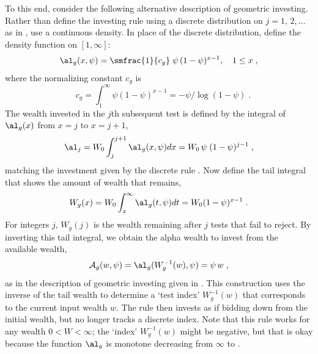 \documentclass[12pt]{article}
\begin{document}
 To this end, consider the following alternative description of geometric
 investing.  Rather than define the investing rule using a discrete distribution
 on $j=1,\,2,\ldots$ as in , use a continuous density.  In place of
 the discrete distribution, define the density function on $[1,\infty]$:
 \begin{equation}
   \al_{g}(x,\psi) = \smfrac{1}{c_g} \; \psi\,(1-\psi)^{x-1}, \quad 1 \le x\;,
 \label{eq:alg}
 \end{equation}
 where the normalizing constant $c_g$ is
 \begin{displaymath}
   \quad c_g = \int_1^\infty \psi(1-\psi)^{x-1} = -\psi/\log (1-\psi)\;.     
 \end{displaymath}
 The wealth invested in the $j$th subsequent test is defined by the integral of
 $\al_g(x)$ from $x=j$ to $x=j+1$,
 \begin{equation}
    \al_j = W_0 \int_j^{j+1} \al_g(x,\psi) dx = W_0 \, \psi\; (1-\psi)^{j-1} \;,
 \label{eq:alj2}
 \end{equation}
 matching the investment given by the discrete rule .  Now define
 the tail integral that shows the amount of wealth that remains,
 \begin{equation}
    W_g(x) = W_0 \int_x^\infty \al_g(t,\psi) dt = W_0 (1-\psi)^{x-1}\;.
 \label{eq:Wg}
 \end{equation}
 For integers $j$, $W_g(j)$ is the wealth remaining after $j$ tests that fail to
 reject.  By inverting this tail integral, we obtain the alpha wealth to invest
 from the available wealth,
 \begin{equation}
   {\cal A}_g(w,\psi) = \al_g(W_g^{-1}(w),\psi) = \psi\,w \;,
 \label{eq:Ag}
 \end{equation}
 as in the description of geometric investing given in .  This
 construction uses the inverse of the tail wealth to determine a `test index'
 $W_g^{-1}(w)$ that corresponds to the current input wealth $w$.  The rule then
 invests as if bidding down from the initial wealth, but no longer tracks a
 discrete index.  Note that this rule works for any wealth $0 < W < \infty$; the
`index' $W_g^{-1}(w)$ might be negative, but that is okay because the function
$\al_g$ is monotone decreasing from $\infty$ to  .
\end{document}
